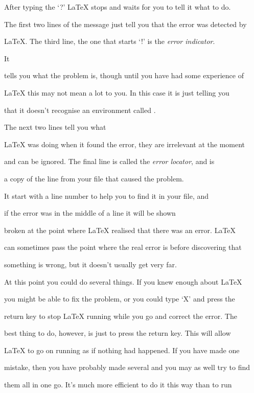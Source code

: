 After typing the `?' \LaTeX{} stops and waits for you to tell it what to do.



The first two lines of the message just tell you that the error was detected by

\LaTeX{}. The third line, the one that starts `!' is the {\em error indicator}.

 It

tells you what the problem is, though until you have had some experience of

\LaTeX{} this may not mean a lot to you.  In this case it is just telling you

that it doesn't recognise an environment called .

The next two lines tell you what

\LaTeX{} was doing when it found the error, they are irrelevant at the moment

and can be ignored. The final line is called the {\em error locator}, and is

a copy of the line from your file that caused the problem.

It start with a line number to help you to find it in your file, and

if the error was in the middle of a line it will be shown

broken at the point where \LaTeX{} realised that there was an error.  \LaTeX{}

can sometimes pass the point where the real error is before discovering that

something is wrong, but it doesn't usually get very far.



At this point you could do several things.  If you knew enough about \LaTeX{}

you might be able to fix the problem, or you could type `X' and press the

return key to stop \LaTeX{} running while you go and correct the error.  The

best thing to do, however, is just to press the return key.  This will allow

\LaTeX{} to go on running as if nothing had happened.  If you have made one

mistake, then you have probably made several and you may as well try to find

them all in one go.  It's much more efficient to do it this way than to run

